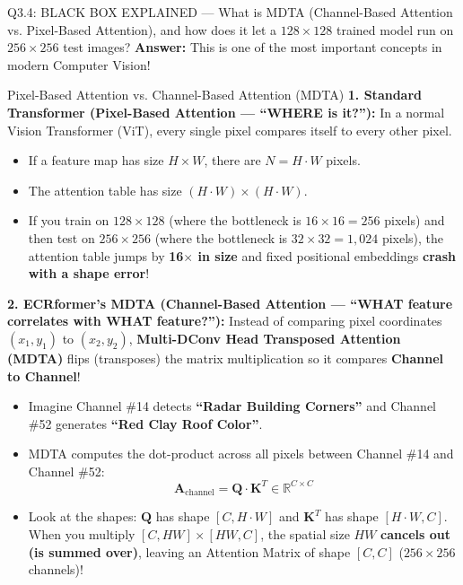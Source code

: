 \documentclass[11pt,a4paper]{article}
\begin{document}
\begin{qbox}{Q3.4: BLACK BOX EXPLAINED — What is MDTA (Channel-Based Attention vs. Pixel-Based Attention), and how does it let a $128\times 128$ trained model run on $256\times 256$ test images?}
\textbf{Answer:}
This is one of the most important concepts in modern Computer Vision!

\begin{blackbox}{Pixel-Based Attention vs. Channel-Based Attention (MDTA)}
\textbf{1. Standard Transformer (Pixel-Based Attention — ``WHERE is it?''):}
In a normal Vision Transformer (ViT), every single pixel compares itself to every other pixel.
\begin{itemize}[leftmargin=18pt]
    \item If a feature map has size $H \times W$, there are $N = H \cdot W$ pixels.
    \item The attention table has size $(H \cdot W) \times (H \cdot W)$.
    \item If you train on $128\times 128$ (where the bottleneck is $16\times 16 = 256$ pixels) and then test on $256\times 256$ (where the bottleneck is $32\times 32 = 1{,}024$ pixels), the attention table jumps by \textbf{16$\times$ in size} and fixed positional embeddings \textbf{crash with a shape error}!
\end{itemize}

\textbf{2. ECRformer's MDTA (Channel-Based Attention — ``WHAT feature correlates with WHAT feature?''):}
Instead of comparing pixel coordinates $(x_1, y_1)$ to $(x_2, y_2)$, \textbf{Multi-DConv Head Transposed Attention (MDTA)} flips (transposes) the matrix multiplication so it compares \textbf{Channel to Channel}!
\begin{itemize}[leftmargin=18pt]
    \item Imagine Channel \#14 detects \textbf{``Radar Building Corners''} and Channel \#52 generates \textbf{``Red Clay Roof Color''}.
    \item MDTA computes the dot-product across all pixels between Channel \#14 and Channel \#52:
    $$\mathbf{A}_{\text{channel}} = \mathbf{Q} \cdot \mathbf{K}^T \in \mathbb{R}^{C \times C}$$
    \item Look at the shapes: $\mathbf{Q}$ has shape $[C, H\cdot W]$ and $\mathbf{K}^T$ has shape $[H\cdot W, C]$. When you multiply $[C, HW] \times [HW, C]$, the spatial size $HW$ \textbf{cancels out (is summed over)}, leaving an Attention Matrix of shape \textbf{$[C, C]$} ($256 \times 256$ channels)!
\end{itemize}
\end{blackbox}


\end{qbox}
\end{document}
